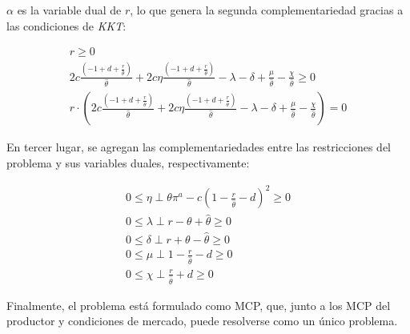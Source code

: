 $\alpha$ es la variable dual de $r$, lo que genera la segunda complementariedad gracias a las condiciones de \textit{KKT}:

\begin{footnotesize}
\begin{align}
    r \geq 0 \\
   2c\frac{(-1+d+\frac{r}{\hat{\theta}})}{\hat{\theta}} + 2c\eta \frac{(-1+d+\frac{r}{\hat{\theta}})}{\hat{\theta}} - \lambda - \delta + \frac{\mu}{\hat{\theta}} - \frac{\chi}{\hat{\theta}} \geq 0\\
   r \cdot (2c\frac{(-1+d+\frac{r}{\hat{\theta}})}{\hat{\theta}} + 2c\eta \frac{(-1+d+\frac{r}{\hat{\theta}})}{\hat{\theta}} - \lambda - \delta + \frac{\mu}{\hat{\theta}} - \frac{\chi}{\hat{\theta}})=0
\end{align}
\end{footnotesize}

En tercer lugar, se agregan las complementariedades entre las restricciones del problema y sus variables duales, respectivamente:

\begin{footnotesize}
\begin{align}
0 \leq \eta \perp \theta \pi^a - c(1-\frac{r}{\hat{\theta}}-d)^2 \geq 0 \\
0 \leq \lambda \perp r - \theta + \hat{\theta} \geq 0 \\
0 \leq \delta \perp r + \theta - \hat{\theta} \geq 0\\
0 \leq \mu \perp 1-\frac{r}{\hat{\theta}}-d \geq 0\\
0 \leq\chi \perp \frac{r}{\hat{\theta}} + d \geq 0 
\end{align}
\end{footnotesize}

Finalmente, el problema está formulado como MCP, que, junto a los MCP del productor y condiciones de mercado, puede resolverse como un único problema.